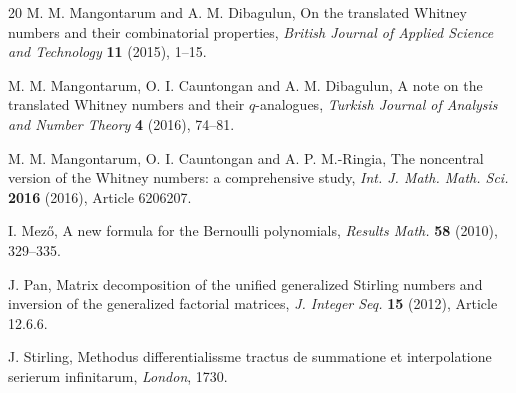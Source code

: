 \documentclass[12pt]{article}
\begin{document}
\begin{thebibliography}{20}
	 M. M. Mangontarum and A. M. Dibagulun, On the translated Whitney numbers and their combinatorial properties, \textit{British Journal of Applied Science and Technology} \textbf{11} (2015), 1--15.
	
	 M. M. Mangontarum, O. I. Cauntongan and A. M. Dibagulun, A note on the translated Whitney numbers and their $q$-analogues, \textit{Turkish Journal of Analysis and Number Theory} \textbf{4} (2016), 74--81.
	
	 M. M. Mangontarum, O. I. Cauntongan and A. P. M.-Ringia, The noncentral version of the Whitney numbers: a comprehensive study, \textit{Int. J. Math. Math. Sci.} \textbf{2016} (2016), Article 6206207.
	
	 I. Mez\H{o}, A new formula for the Bernoulli polynomials, \textit{Results Math.} \textbf{58} (2010), 329--335.
	
	 J. Pan, Matrix decomposition of the unified generalized Stirling numbers and inversion of the generalized factorial matrices, \textit{J. Integer Seq.} \textbf{15} (2012), Article 12.6.6.
	
	 J. Stirling, Methodus differentialissme tractus de summatione et interpolatione serierum infinitarum, \textit{London}, 1730.
	
\end{thebibliography}
\end{document}
